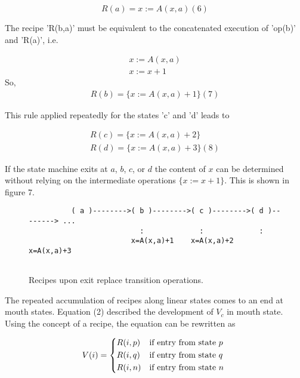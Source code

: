\documentclass[12pt,a4paper]{scrartcl}
\begin{document}
\begin{equation}
\label{eq:}
               R(a) = { x := A(x,a) }                                     (6)
\end{equation}


The recipe 'R(b,a)' must be equivalent to the concatenated execution of 'op(b)'
and 'R(a)', i.e.

\begin{eqnarray}
    { x  :=  A(x,a) } \\
    { x  :=  x + 1 }
\end{eqnarray}
So, 
\begin{eqnarray}
    R(b)  =  \{ x := A(x,a) + 1 \}                                 (7)
\end{eqnarray}

This rule applied repeatedly for the states 'c' and 'd' leads to

\begin{eqnarray}
    R(c)  =  \{ x := A(x,a) + 2 \} \\
    R(d)  =  \{ x := A(x,a) + 3 \}                                 (8)
\end{eqnarray}

If the state machine exits at $a$, $b$, $c$, or $d$ the content of $x$ can be
determined without relying on the intermediate operations $\{ x:=x+1 \}$. This
is shown in figure 7.
 
\begin{figure}[htbp] \leavevmode
\begin{verbatim}
          ( a )-------->( b )-------->( c )-------->( d )--------> ...
                          :             :             :
                        x=A(x,a)+1    x=A(x,a)+2    x=A(x,a)+3


\end{verbatim}
\caption{Recipes upon exit replace transition operations.}
\end{figure}

The repeated accumulation of recipes along linear states comes to an end at
mouth states.  Equation (2) described the development of $V_c$ in mouth
state. Using the concept of a recipe, the equation can be rewritten as

\begin{eqnarray}
    V(i)  =  \begin{dcases*}
               R(i,p) &  if entry from state $p$ \\
               R(i,q) &  if entry from state $q$ \\
               R(i,n) &  if entry from state $n$
            \end{dcases*}
\end{eqnarray}
\end{document}
